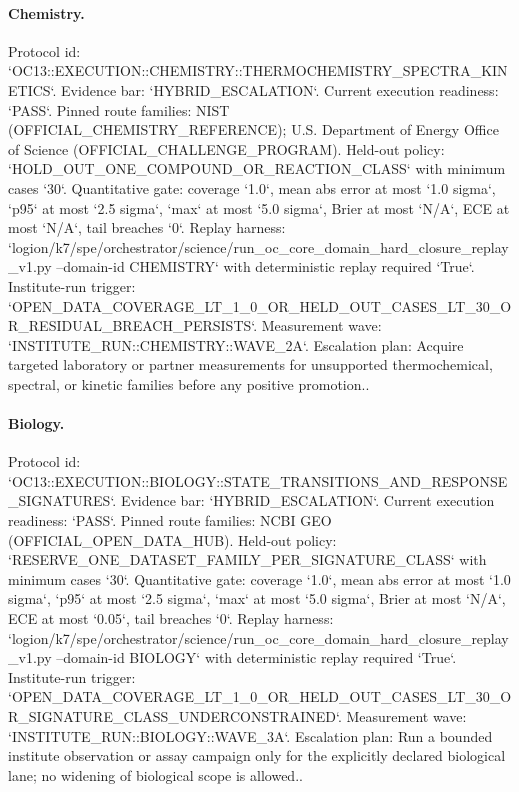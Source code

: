 \paragraph{Chemistry.}
Protocol id: `OC13::EXECUTION::CHEMISTRY::THERMOCHEMISTRY\_SPECTRA\_KINETICS`. Evidence bar: `HYBRID\_ESCALATION`. Current execution readiness: `PASS`.
Pinned route families: NIST (OFFICIAL\_CHEMISTRY\_REFERENCE); U.S. Department of Energy Office of Science (OFFICIAL\_CHALLENGE\_PROGRAM).
Held-out policy: `HOLD\_OUT\_ONE\_COMPOUND\_OR\_REACTION\_CLASS` with minimum cases `30`.
Quantitative gate: coverage `1.0`, mean abs error at most `1.0 sigma`, `p95` at most `2.5 sigma`, `max` at most `5.0 sigma`, Brier at most `N/A`, ECE at most `N/A`, tail breaches `0`.
Replay harness: `logion/k7/spe/orchestrator/science/run\_oc\_core\_domain\_hard\_closure\_replay\_v1.py --domain-id CHEMISTRY` with deterministic replay required `True`.
Institute-run trigger: `OPEN\_DATA\_COVERAGE\_LT\_1\_0\_OR\_HELD\_OUT\_CASES\_LT\_30\_OR\_RESIDUAL\_BREACH\_PERSISTS`. Measurement wave: `INSTITUTE\_RUN::CHEMISTRY::WAVE\_2A`.
Escalation plan: Acquire targeted laboratory or partner measurements for unsupported thermochemical, spectral, or kinetic families before any positive promotion..

\paragraph{Biology.}
Protocol id: `OC13::EXECUTION::BIOLOGY::STATE\_TRANSITIONS\_AND\_RESPONSE\_SIGNATURES`. Evidence bar: `HYBRID\_ESCALATION`. Current execution readiness: `PASS`.
Pinned route families: NCBI GEO (OFFICIAL\_OPEN\_DATA\_HUB).
Held-out policy: `RESERVE\_ONE\_DATASET\_FAMILY\_PER\_SIGNATURE\_CLASS` with minimum cases `30`.
Quantitative gate: coverage `1.0`, mean abs error at most `1.0 sigma`, `p95` at most `2.5 sigma`, `max` at most `5.0 sigma`, Brier at most `N/A`, ECE at most `0.05`, tail breaches `0`.
Replay harness: `logion/k7/spe/orchestrator/science/run\_oc\_core\_domain\_hard\_closure\_replay\_v1.py --domain-id BIOLOGY` with deterministic replay required `True`.
Institute-run trigger: `OPEN\_DATA\_COVERAGE\_LT\_1\_0\_OR\_HELD\_OUT\_CASES\_LT\_30\_OR\_SIGNATURE\_CLASS\_UNDERCONSTRAINED`. Measurement wave: `INSTITUTE\_RUN::BIOLOGY::WAVE\_3A`.
Escalation plan: Run a bounded institute observation or assay campaign only for the explicitly declared biological lane; no widening of biological scope is allowed..

